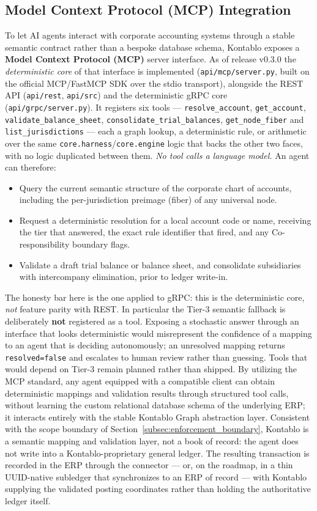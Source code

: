 \subsection{Model Context Protocol (MCP) Integration}
To let AI agents interact with corporate accounting systems through a stable semantic contract rather than a bespoke database schema, Kontablo exposes a \textbf{Model Context Protocol (MCP)} server interface. As of release v0.3.0 the \emph{deterministic core} of that interface is implemented (\texttt{api/mcp/server.py}, built on the official MCP/FastMCP SDK over the stdio transport), alongside the REST API (\texttt{api/rest}, \texttt{api/src}) and the deterministic gRPC core (\texttt{api/grpc/server.py}). It registers six tools --- \texttt{resolve\_account}, \texttt{get\_account}, \texttt{validate\_balance\_sheet}, \texttt{consolidate\_trial\_balances}, \texttt{get\_node\_fiber} and \texttt{list\_jurisdictions} --- each a graph lookup, a deterministic rule, or arithmetic over the same \texttt{core.harness}\slash\texttt{core.engine} logic that backs the other two faces, with no logic duplicated between them. \emph{No tool calls a language model.} An agent can therefore:
\begin{itemize}
    \item Query the current semantic structure of the corporate chart of accounts, including the per-jurisdiction preimage (fiber) of any universal node.
    \item Request a deterministic resolution for a local account code or name, receiving the tier that answered, the exact rule identifier that fired, and any Co-responsibility boundary flags.
    \item Validate a draft trial balance or balance sheet, and consolidate subsidiaries with intercompany elimination, prior to ledger write-in.
\end{itemize}
The honesty bar here is the one applied to gRPC: this is the deterministic core, \emph{not} feature parity with REST. In particular the Tier-3 semantic fallback is deliberately \textbf{not} registered as a tool. Exposing a stochastic answer through an interface that looks deterministic would misrepresent the confidence of a mapping to an agent that is deciding autonomously; an unresolved mapping returns \texttt{resolved=false} and escalates to human review rather than guessing. Tools that would depend on Tier-3 remain planned rather than shipped.
By utilizing the MCP standard, any agent equipped with a compatible client can obtain deterministic mappings and validation results through structured tool calls, without learning the custom relational database schema of the underlying ERP; it interacts entirely with the stable Kontablo Graph abstraction layer. Consistent with the scope boundary of Section~\ref{subsec:enforcement_boundary}, Kontablo is a semantic mapping and validation layer, not a book of record: the agent does not write into a Kontablo-proprietary general ledger. The resulting transaction is recorded in the ERP through the connector --- or, on the roadmap, in a thin UUID-native subledger that synchronizes to an ERP of record --- with Kontablo supplying the validated posting coordinates rather than holding the authoritative ledger itself.

